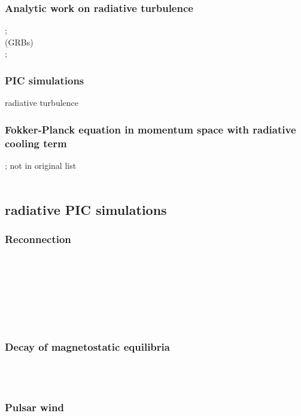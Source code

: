 \documentclass{aa}
\begin{document}
\subsubsection{Analytic work on radiative turbulence}
\citep{Uzdensky_2018}; \\
\citep{Zrake_2018} (GRBs) \\
\citep{Sobacchi_2019}; \\
 
\subsubsection{PIC simulations}
\citep{Zhdankin_2019b} radiative turbulence\\


\subsubsection{Fokker-Planck equation in momentum space with radiative cooling term}
\citep{Schlickeiser_1984, Schlickeiser_1985}; not in original list \citep{Schlickeiser_1989} \\
\citep{Stawarz_2008} \\


\subsection{radiative PIC simulations}

\subsubsection{Reconnection}
\citep{Jaroschek_2009} \\
\citep{Cerutti_2013, Cerutti_2014, Cerutti_2014a} \\
\citep{Kagan_2016, Kagan_2016b} \\
\citep{Hakobyan_2019} \\
\citep{Werner_2019} \\
\citep{Schoeffler_2019} \\

\subsubsection{Decay of magnetostatic equilibria}
\citep{Yuan_2016} \\
\citep{Nalewajko_2018} \\

\subsubsection{Pulsar wind}
\citep{Cerutti_2017} \\
\end{document}
